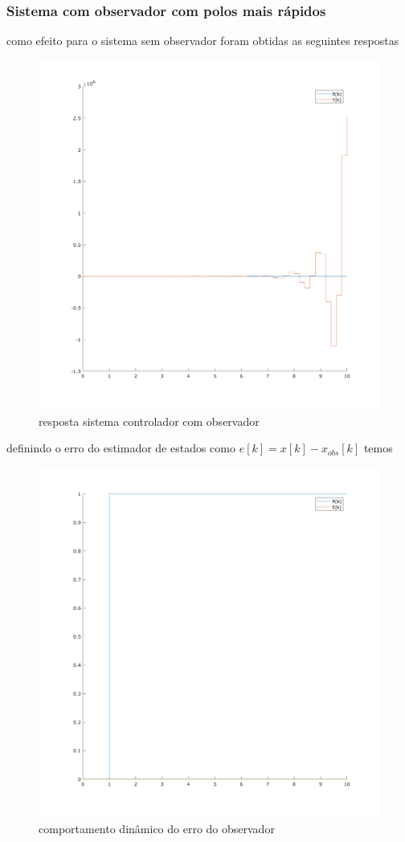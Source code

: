 \documentclass[a4paper,11pt]{article}
\begin{document}
\subsubsection{Sistema com observador com polos mais rápidos}

como efeito para o sistema sem observador foram obtidas as seguintes respostas

\begin{figure}[H]
    \centering
    \includegraphics[width=0.9\linewidth]{img/exsim6-ssobs1-sim.png}
    \caption{resposta sistema controlador com observador}
\end{figure}

definindo o erro do estimador de estados como $e[k] = x[k] - x_{obs}[k]$ temos

\begin{figure}[H]
    \centering
    \includegraphics[width=0.9\linewidth]{img/exsim6-ssobs1-err-sim.png}
    \caption{comportamento dinâmico do erro do observador}
\end{figure}
\end{document}

